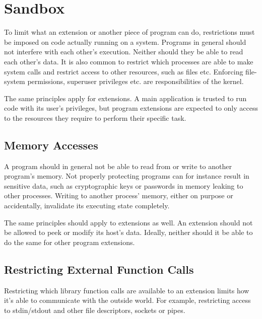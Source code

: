 \chapter{Sandbox}

To limit what an extension or another piece of program can do, restrictions
must be imposed on code actually running on a system. Programs in general
should not interfere with each other's execution. Neither should they be able
to read each other's data. It is also common to restrict which processes are
able to make system calls and restrict access to other resources, such as files
etc. Enforcing file-system permissions, superuser privileges etc. are
responsibilities of the kernel.

The same principles apply for extensions. A main application is trusted to run
code with its user's privileges, but program extensions are expected to only
access to the resources they require to perform their specific task.

\section{Memory Accesses}

A program should in general not be able to read from or write to another
program's memory. Not properly protecting programs can for instance result in
sensitive data, such as cryptographic keys or passwords in memory leaking to
other processes. Writing to another process' memory, either on purpose or
accidentally, invalidate its executing state completely.

The same principles should apply to extensions as well. An extension should not
be allowed to peek or modify its host's data. Ideally, neither should it be
able to do the same for other program extensions.

\section{Restricting External Function Calls}

Restricting which library function calls are available to an extension limits
how it's able to communicate with the outside world. For example, restricting
access to stdin/stdout and other file descriptors, sockets or pipes.
